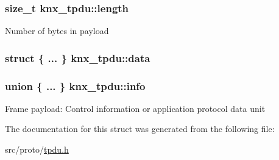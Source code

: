 \subsubsection[{\texorpdfstring{length}{length}}]{\setlength{\rightskip}{0pt plus 5cm}size\+\_\+t knx\+\_\+tpdu\+::length}\hypertarget{structknx__tpdu_a3d47bdbccf5dbb1865ed2b4b88588d48}{}\label{structknx__tpdu_a3d47bdbccf5dbb1865ed2b4b88588d48}
Number of bytes in {\ttfamily payload} 
\subsubsection[{\texorpdfstring{data}{data}}]{\setlength{\rightskip}{0pt plus 5cm}struct \{ ... \}   knx\+\_\+tpdu\+::data}\hypertarget{structknx__tpdu_aa9ed5329afde048f53431af7a4582726}{}\label{structknx__tpdu_aa9ed5329afde048f53431af7a4582726}
\subsubsection[{\texorpdfstring{info}{info}}]{\setlength{\rightskip}{0pt plus 5cm}union \{ ... \}   knx\+\_\+tpdu\+::info}\hypertarget{structknx__tpdu_a2dcc1d62735212949841a228cc5c45e8}{}\label{structknx__tpdu_a2dcc1d62735212949841a228cc5c45e8}
Frame payload\+: Control information or application protocol data unit 

The documentation for this struct was generated from the following file\+:\begin{DoxyCompactItemize}
\item 
src/proto/\hyperlink{tpdu_8h}{tpdu.\+h}\end{DoxyCompactItemize}
